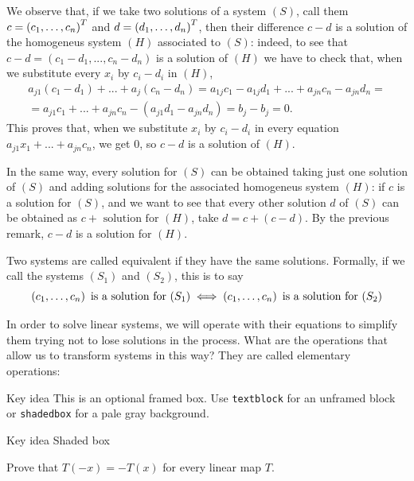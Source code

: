 We observe that, if we take two solutions of a system $(S)$, call them $c=\hvc{c}{}^T$ and $d=\hvc{d}{}^T$, then their difference $c-d$ is a solution of the homogeneus system $(H)$ associated to $(S)$: indeed, to see that $c-d=(c_{1}-d_{1},...,c_{n}-d_{n})$ is a solution of $(H)$ we have to check that, when we substitute every $x_{i}$ by $c_{i}-d_{i}$ in $(H)$,
\begin{gather*}
  a_{j1}(c_{1}-d_{1})+...+a_{j}(c_{n}-d_{n}) = a_{1j}c_{1}-a_{1j}d_{1}+...+a_{jn}c_{n}-a_{jn}d_{n} =\\
  =a_{j1}c_{1}+...+a_{jn}c_{n}-(a_{j1}d_{1}-a_{jn}d_{n}) = b_{j}-b_{j}=0.
\end{gather*}
This proves that, when we substitute $x_{i}$ by $c_{i}-d_{i}$ in every equation $a_{j1}x_{1}+...+a_{jn}c_{n}$, we get $0$, so $c-d$ is a solution of $(H)$.

In the same way, every solution for $(S)$ can be obtained taking just one solution of $(S)$ and adding solutions for the associated homogeneus system $(H)$: if $c$ is a solution for $(S)$, and we want to see that every other solution $d$ of $(S)$ can be obtained as $c + \text{ solution for } (H)$, take $d = c+(c-d)$. By the previous remark, $c-d$ is a solution for $(H)$.

\begin{definition}
    Two systems are called equivalent if they have the same solutions. Formally, if we call the systems $(S_1)$ and $(S_2)$, this is to say
    \begin{equation*}
      \hvc{c}{} \text{ is a solution for } (S_1) \iff \hvc{c}{} \text{ is a solution for } (S_2)
    \end{equation*}
\end{definition}

In order to solve linear systems, we will operate with their equations to simplify them trying not to lose solutions in the process. What are the operations that allow us to transform systems in this way? They are called elementary operations:



\begin{textbox}{Key idea}
This is an optional framed box. Use \texttt{textblock} for an unframed
block or \texttt{shadedbox} for a pale gray background.
\end{textbox}
\begin{shadedbox}{Key idea}
  Shaded box
\end{shadedbox}

\begin{exercises}
\begin{exercise}\label{ex:first}
Prove that \(T(-x)=-T(x)\) for every linear map \(T\).
\end{exercise}
\end{exercises}
